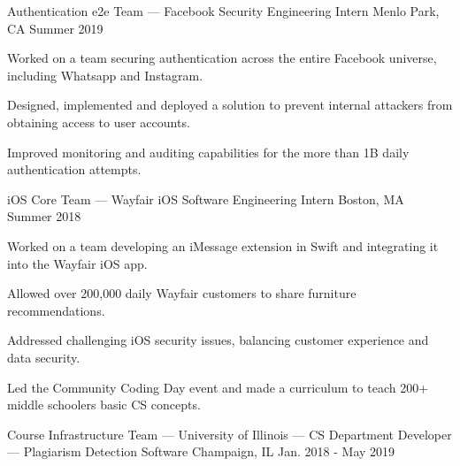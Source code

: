 
\begin{cventries}

\cventry
{Authentication e2e Team — Facebook} %
{Security Engineering Intern} %
{Menlo Park, CA} %
{Summer 2019} %
{
	\begin{cvitems} %
		\item {Worked on a team securing authentication across the entire Facebook universe, including Whatsapp and Instagram.}
		\item {Designed, implemented and deployed a solution to prevent internal attackers from obtaining access to user accounts.}
		\item {Improved monitoring and auditing capabilities for the more than 1B daily authentication attempts.}
	\end{cvitems}
}
\cventry
{\textnormal{i}OS Core Team — Wayfair} %
{iOS Software Engineering Intern} %
{Boston, MA} %
{Summer 2018} %
{
	\begin{cvitems} %
		\item {Worked on a team developing an iMessage extension in Swift and integrating it into the Wayfair iOS app.}
		\item {Allowed over 200,000 daily Wayfair customers to share furniture recommendations.}
		\item {Addressed challenging iOS security issues, balancing customer experience and data security.}
		\item {Led the Community Coding Day event and made a curriculum to teach 200+ middle schoolers basic CS concepts.}
	\end{cvitems}
}
\cventry
{Course Infrastructure Team — University of Illinois — CS Department} %
{Developer — Plagiarism Detection Software} %
{Champaign, IL} %
{Jan. 2018 - May 2019} %
{
	\begin{cvitems} %

\end{cvitems}}
\end{cventries}
